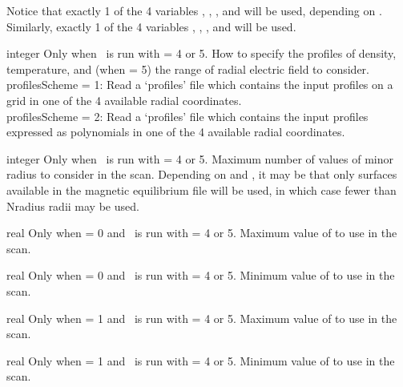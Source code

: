Notice that exactly 1 of the 4 variables , , , and 
will be used, depending on
.
Similarly, exactly 1 of the 4 variables
, , , and 
will be used.

\myhrule

{integer}
{Only when \sfincsScan~is run with  = 4 or 5.}
{How to specify the profiles of density, temperature, and (when   = 5)
the range of radial electric field to consider.\\

{\ttfamily profilesScheme} = 1: Read a `{\ttfamily profiles}' file which contains the input profiles on a grid in one of the 4 available radial coordinates.\\

{\ttfamily profilesScheme} = 2: Read a `{\ttfamily profiles}' file which contains the input profiles expressed as polynomials in one of the 4 available radial coordinates.
}

\myhrule

{integer}
{Only when \sfincsScan~is run with  = 4 or 5.}
{Maximum number of values of minor radius to consider in the scan.
Depending on  and ,
it may be that only surfaces available in the magnetic equilibrium file will be
used, in which case fewer than {\ttfamily Nradius} radii may be used.}

\myhrule

{real}
{Only when  = 0 and \sfincsScan~is run with  = 4 or 5.}
{Maximum value of  to use in the scan.}

\myhrule

{real}
{Only when  = 0 and \sfincsScan~is run with  = 4 or 5.}
{Minimum value of  to use in the scan.}

\myhrule

{real}
{Only when  = 1 and \sfincsScan~is run with  = 4 or 5.}
{Maximum value of  to use in the scan.}

\myhrule

{real}
{Only when  = 1 and \sfincsScan~is run with  = 4 or 5.}
{Minimum value of  to use in the scan.}

